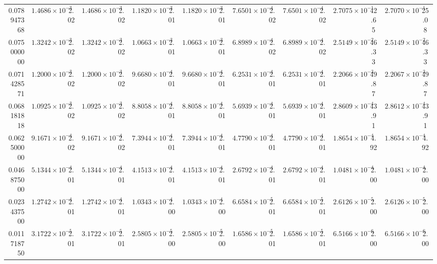 \begin{table}
{\begin{tabular}{r cc cc cc cc cc cc cc cc }
0.078947368 & $1.4686\times10^{-3}$ & 2.02 & $1.4686\times10^{-3}$ & 2.02 & $1.1820\times10^{-3}$ & 2.01 & $1.1820\times10^{-3}$ & 2.01 & $7.6501\times10^{-4}$ & 2.02 & $7.6501\times10^{-4}$ & 2.02 & $2.7075\times10^{-1}$ & 42.65 & $2.7070\times10^{-1}$ & 25.08 \\
0.075000000 & $1.3242\times10^{-3}$ & 2.02 & $1.3242\times10^{-3}$ & 2.02 & $1.0663\times10^{-3}$ & 2.01 & $1.0663\times10^{-3}$ & 2.01 & $6.8989\times10^{-4}$ & 2.02 & $6.8989\times10^{-4}$ & 2.02 & $2.5149\times10^{-2}$ & 46.33 & $2.5149\times10^{-2}$ & 46.33 \\
0.071428571 & $1.2000\times10^{-3}$ & 2.02 & $1.2000\times10^{-3}$ & 2.02 & $9.6680\times10^{-4}$ & 2.01 & $9.6680\times10^{-4}$ & 2.01 & $6.2531\times10^{-4}$ & 2.01 & $6.2531\times10^{-4}$ & 2.01 & $2.2066\times10^{-3}$ & 49.87 & $2.2067\times10^{-3}$ & 49.87 \\
0.068181818 & $1.0925\times10^{-3}$ & 2.02 & $1.0925\times10^{-3}$ & 2.02 & $8.8058\times10^{-4}$ & 2.01 & $8.8058\times10^{-4}$ & 2.01 & $5.6939\times10^{-4}$ & 2.01 & $5.6939\times10^{-4}$ & 2.01 & $2.8609\times10^{-4}$ & 43.91 & $2.8612\times10^{-4}$ & 43.91 \\
0.062500000 & $9.1671\times10^{-4}$ & 2.02 & $9.1671\times10^{-4}$ & 2.02 & $7.3944\times10^{-4}$ & 2.01 & $7.3944\times10^{-4}$ & 2.01 & $4.7790\times10^{-4}$ & 2.01 & $4.7790\times10^{-4}$ & 2.01 & $1.8654\times10^{-4}$ & 4.92 & $1.8654\times10^{-4}$ & 4.92 \\
0.046875000 & $5.1344\times10^{-4}$ & 2.01 & $5.1344\times10^{-4}$ & 2.01 & $4.1513\times10^{-4}$ & 2.01 & $4.1513\times10^{-4}$ & 2.01 & $2.6792\times10^{-4}$ & 2.01 & $2.6792\times10^{-4}$ & 2.01 & $1.0481\times10^{-4}$ & 2.00 & $1.0481\times10^{-4}$ & 2.00 \\
0.023437500 & $1.2742\times10^{-4}$ & 2.01 & $1.2742\times10^{-4}$ & 2.01 & $1.0343\times10^{-4}$ & 2.00 & $1.0343\times10^{-4}$ & 2.00 & $6.6584\times10^{-5}$ & 2.01 & $6.6584\times10^{-5}$ & 2.01 & $2.6126\times10^{-5}$ & 2.00 & $2.6126\times10^{-5}$ & 2.00 \\
0.011718750 & $3.1722\times10^{-5}$ & 2.01 & $3.1722\times10^{-5}$ & 2.01 & $2.5805\times10^{-5}$ & 2.00 & $2.5805\times10^{-5}$ & 2.00 & $1.6586\times10^{-5}$ & 2.01 & $1.6586\times10^{-5}$ & 2.01 & $6.5166\times10^{-6}$ & 2.00 & $6.5166\times10^{-6}$ & 2.00 \\
\bottomrule
\end{tabular}}
\end{table}
